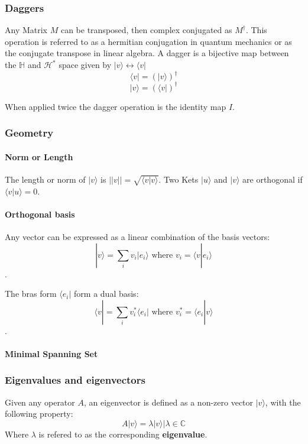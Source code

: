\documentclass[11pt]{article}
\providecommand{\bra}[1]{\langle#1|}
\providecommand{\ket}[1]{|#1\rangle}
\providecommand{\braket}[2]{\langle#1|#2\rangle}
\theoremstyle{definition}
\theoremstyle{definition}
\begin{document}
\subsubsection{Daggers}
\label{sec:org615cf3f}
Any Matrix \(M\) can be transposed, then complex conjugated as \(M^\dagger\).
This operation is referred to as a hermitian conjugation in quantum
mechanics or as the conjugate transpose in linear algebra.
A dagger is a bijective map between the \(\mathbb{H}\) and \(\mathcal{H}^*\) space
given by \(\ket{v} \leftrightarrow \bra{v}\)
$$\bra{v} = (\ket{v})^\dagger$$
$$\ket{v} = (\bra{v})^\dagger$$

When applied twice the dagger operation is the identity map \(I\).


\subsubsection{Geometry}
\label{sec:org7e4dab3}

\paragraph{Norm or Length}
\label{sec:orgb833de2}
The length or norm of \(\ket{v}\) is \(||v|| = \sqrt{\braket{v}{v}}\).
Two Kets \(\ket{u}\) and \(\ket{v}\) are orthogonal if \(\braket{v}{u} = 0\).


\paragraph{Orthogonal basis}
\label{sec:orge9a3dd7}
Any vector can be expressed as a linear combination of the basis vectors:
$$ \ket{v} = \sum_i{v_i \ket{e_i}} \text{ where } v_i = \braket{v}{e_i}$$.

The bras form \(\bra{e_i}\) form a dual basis:
$$\bra{v} =  \sum_i{v_i^* \bra{e_i}} \text{ where } v_i^* = \braket{e_i}{v}$$.

\paragraph{Minimal Spanning Set}
\label{sec:orgf9b81f4}

\subsubsection{Eigenvalues and eigenvectors}
\label{sec:orgf211f2a}
Given any operator \(A\), an eigenvector is defined as a non-zero vector \(\ket{v}\), with
the following property:
$$A\ket{v} = \lambda \ket{v} | \lambda \in \mathbb{C}$$
Where \(\lambda\) is refered to as the corresponding \textbf{eigenvalue}.
\end{document}
